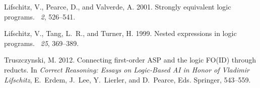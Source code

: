 \documentclass{tlp}
\begin{document}
\begin{thebibliography}{}
{\sc Lifschitz, V.}, {\sc Pearce, D.}, {\sc and} {\sc Valverde, A.} 2001.
\newblock Strongly equivalent logic programs.
~{\em 2}, 526--541.

{\sc Lifschitz, V.}, {\sc Tang, L.~R.}, {\sc and} {\sc Turner, H.} 1999.
\newblock Nested expressions in logic programs.
~{\em 25},
  369--389.

{\sc Truszczynski, M.} 2012.
\newblock Connecting first-order {ASP} and the logic {FO(ID)} through reducts.
\newblock In {\em Correct Reasoning: Essays on Logic-Based AI in Honor of
  Vladimir Lifschitz}, {E.~Erdem}, {J.~Lee}, {Y.~Lierler}, {and} {D.~Pearce},
  Eds. Springer, 543--559.

\end{thebibliography}
\end{document}
